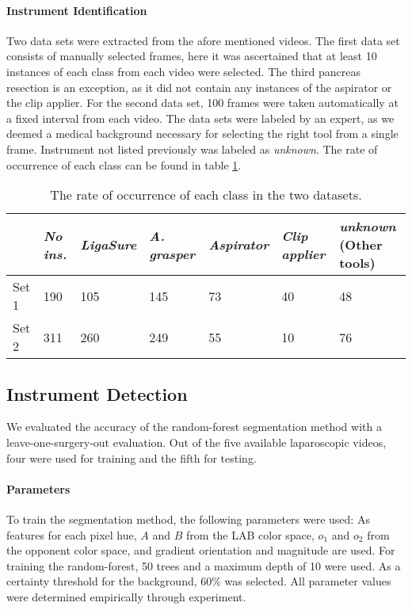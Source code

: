 \documentclass{llncs}
\begin{document}
\paragraph{Instrument Identification}
Two data sets were extracted from the afore mentioned videos.
The first data set consists of manually selected frames, here it was ascertained that at least 10 instances of each class from each video were selected.
The third pancreas resection is an exception, as it did not contain any instances of the aspirator or the clip applier.
For the second data set, 100 frames were taken automatically at a fixed interval from each video.
The data sets were labeled by an expert, as we deemed a medical background necessary for selecting the right tool from a single frame.
Instrument not listed previously was labeled as \textit{unknown}.
The rate of occurrence of each class can be found in table \ref{ev:occ}.
\begin{table}[b]
\caption{The rate of occurrence of each class in the two datasets.}
 
\centering
 \begin{tabular}{l||l|l|l|l|l|l}
  & \textit{No ins.} & \textit{LigaSure} & \textit{A. grasper} & \textit{Aspirator} & \textit{Clip applier}  & \textit{unknown} (Other tools)\\
 \hline
 \hline
Set 1&190&105&145&73&40&48\\
Set 2&311&260&249&55&10&76\\
 \hline
  \hline
 \end{tabular}
  \label{ev:occ}
 \end{table}
 
\subsection{Instrument Detection}
We evaluated the accuracy of the random-forest segmentation method with a leave-one-surgery-out evaluation.
Out of the five available laparoscopic videos, four were used for training and the fifth for testing.

\paragraph{Parameters}
To train the segmentation method, the following parameters were used: As features for each pixel hue, $A$ and $B$ from the LAB color space, $o_1$ and $o_2$ from the opponent color space, and gradient orientation and magnitude are used.
For training the random-forest, 50 trees and a maximum depth of 10 were used.
As a certainty threshold for the background, 60\% was selected.
All parameter values were determined empirically through experiment. 
\end{document}
